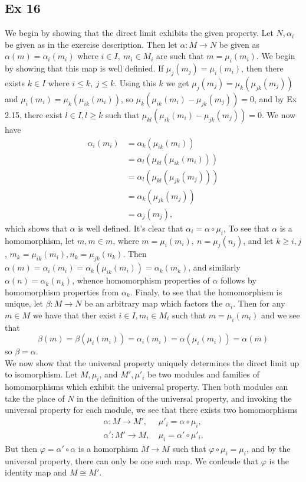 \documentclass{article}
\let\temp\phi
\let\phi\varphi
\let\varphi\temp
\theoremstyle{definition}
\begin{document}
\subsection*{Ex 16}
We begin by showing that the direct limit exhibits the given property. Let
$N, \alpha_{i}$ be given as in the exercise description. Then let $\alpha : M
\to N$ be given as $\alpha(m) = \alpha_{i}(m_i)$ where $i \in I,\ m_i \in M_i$
are such that $m = \mu_i(m_i)$. We begin by showing that this map is well
definied. If $\mu_j(m_j) = \mu_i(m_i)$, then there exists $k \in I$ where $i
\leq k,\ j \leq k$. Using this $k$ we get $\mu_j(m_j) = \mu_k(\mu_{jk}(m_j))$ and
$\mu_i(m_i) = \mu_k(\mu_{ik}(m_i))$, so $\mu_k(\mu_{ik}(m_i) - \mu_{jk}(m_j)) =
0$, and by Ex 2.15, there exist $l \in I, l \geq k$ such that
$\mu_{kl}(\mu_{ik}(m_i) - \mu_{jk}(m_j)) = 0$. We now have
\begin{align*}
	\alpha_i(m_i)
	&=
	\alpha_k(\mu_{ik}(m_i)) \\
	&=
	\alpha_l(\mu_{kl}(\mu_{ik}(m_i))) \\
	&=
	\alpha_l(\mu_{kl}(\mu_{jk}(m_j))) \\
	&=
	\alpha_k(\mu_{jk}(m_j)) \\
	&=
	\alpha_j(m_j),
\end{align*} 
which shows that $\alpha$ is well defined. It's clear that $\alpha_i = \alpha
\circ \mu_i$, To see that $\alpha$ is a homomorphism, let $m, m \in m$, where
$m = \mu_i(m_i),\ n = \mu_j(n_j)$, and let $k \geq i, j$, $m_k = \mu_{ik}(m_i),
n_k = \mu_{jk}(n_k)$. Then $\alpha(m) = \alpha_i(m_i) = \alpha_k(\mu_{ik}(m_i))
= \alpha_k(m_k)$, and similarly $\alpha(n) = \alpha_k(n_k)$, whence
homomorphism properties of $\alpha$ follows by homomorphism properties from
$\alpha_k$. Finaly, to see that the homomorphism is unique, let $\beta : M \to
N$ be an arbitrary map which factors the $\alpha_i$. Then for any $m \in M$ we
have that ther exist $i \in I, m_i \in M_i$ such that $m = \mu_i(m_i)$ and we
see that
\[
	\beta(m)
	=
	\beta(\mu_i(m_i))
	=
	\alpha_i(m_i)
	=
	\alpha(\mu_i(m_i))
	=
	\alpha(m)
\] 
so $\beta = \alpha$. \\

We now show that the universal property uniquely determines the direct limit up
to isomorphism. Let $M, \mu_i$, and $M', \mu'_i$ be two modules and families of
homomorphisms which exhibit the universal property. Then both modules can take
the place of $N$ in the definition of the universal property, and invoking the
universal property for each module, we see that there exists two homomorphisms
\begin{align*}
	\alpha : M \to M', &\ \mu'_i = \alpha \circ \mu_i, \\
	\alpha' : M' \to M, &\ \mu_i = \alpha' \circ \mu'_i.
\end{align*}
But then $\phi = \alpha' \circ \alpha$ is a homorphism $M \to M$
such that $\phi \circ \mu_i = \mu_i$, and by the universal property, 
there can only be one such map. We conlcude that $\phi$ is the identity map 
and $M \cong M'$.
\end{document}
